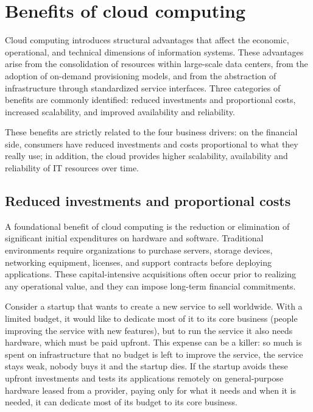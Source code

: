 \section{Benefits of cloud computing}

Cloud computing introduces structural advantages that affect the economic, operational, and technical dimensions of information systems. These advantages arise from the consolidation of resources within large-scale data centers, from the adoption of on-demand provisioning models, and from the abstraction of infrastructure through standardized service interfaces. Three categories of benefits are commonly identified: reduced investments and proportional costs, increased scalability, and improved availability and reliability.

These benefits are strictly related to the four business drivers: on the financial side, consumers have reduced investments and costs proportional to what they really use; in addition, the cloud provides higher scalability, availability and reliability of IT resources over time.

\subsection{Reduced investments and proportional costs}

A foundational benefit of cloud computing is the reduction or elimination of significant initial expenditures on hardware and software. Traditional environments require organizations to purchase servers, storage devices, networking equipment, licenses, and support contracts before deploying applications. These capital-intensive acquisitions often occur prior to realizing any operational value, and they can impose long-term financial commitments.

Consider a startup that wants to create a new service to sell worldwide. With a limited budget, it would like to dedicate most of it to its core business (people improving the service with new features), but to run the service it also needs hardware, which must be paid upfront. This expense can be a killer: so much is spent on infrastructure that no budget is left to improve the service, the service stays weak, nobody buys it and the startup dies. If the startup avoids these upfront investments and tests its applications remotely on general-purpose hardware leased from a provider, paying only for what it needs and when it is needed, it can dedicate most of its budget to its core business.

